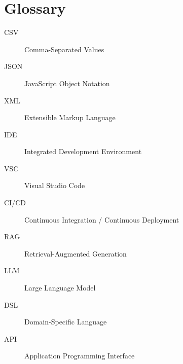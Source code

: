 
\chapter{Glossary}
\label{sec:glossary}

\begin{description}
  \item[CSV] Comma-Separated Values
  \item[JSON] JavaScript Object Notation
  \item[XML] Extensible Markup Language
  \item[IDE] Integrated Development Environment
  \item[VSC] Visual Studio Code
  \item[CI/CD] Continuous Integration / Continuous Deployment
  \item[RAG] Retrieval-Augmented Generation
  \item[LLM] Large Language Model
  \item[DSL] Domain-Specific Language
  \item[API] Application Programming Interface
\end{description}
